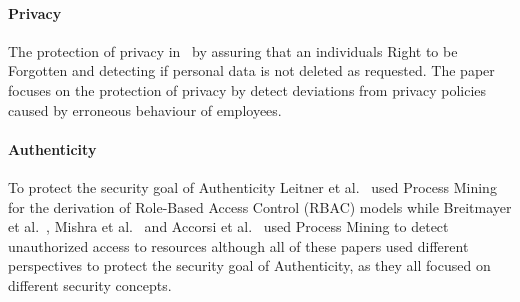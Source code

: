 \documentclass[runningheads]{llncs}
\begin{document}
\paragraph{Privacy} The protection of privacy in~\cite{Zaman20192982} by assuring that an individuals Right to be Forgotten and detecting if personal data is not deleted as requested. The paper~\cite{MozafariMehr202182} focuses on the protection of privacy by
detect deviations from privacy policies caused by erroneous behaviour of employees.
\paragraph{Authenticity} To protect the security goal of Authenticity Leitner et al.~\cite{Leitner2013719} used Process Mining for the derivation of Role-Based Access Control (RBAC) models while Breitmayer et al.~\cite{Breitmayer202411}, Mishra et al.~\cite{Mishra2018613}
and Accorsi et al.~\cite{Accorsi20131462} used Process Mining to detect unauthorized access to resources although all of these papers used different perspectives to protect the security goal of Authenticity, as they all focused on different security concepts.
\end{document}
